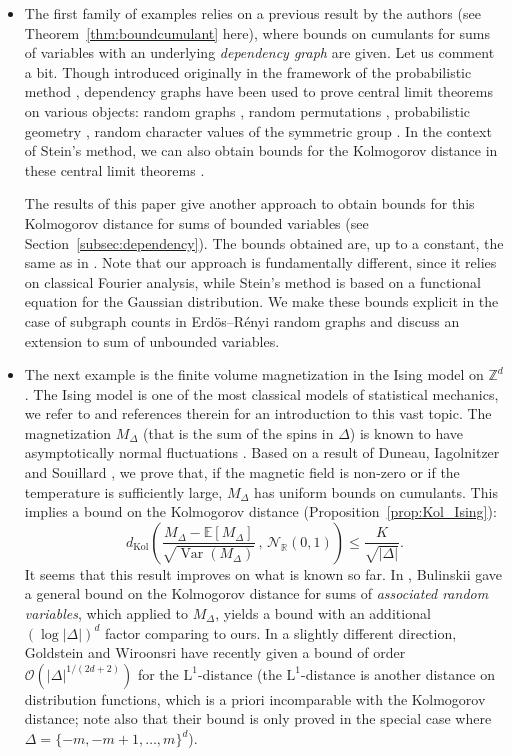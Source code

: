 \documentclass[envcountsame]{svmult}
\def\O{\mathcal{O}}
\newcommand{\Z}{\mathbb{Z}}
\newcommand{\R}{\mathbb{R}}
\newcommand{\esper}{\mathbb{E}}
\newcommand{\leb}{\mathrm{L}}
\newcommand{\dkol}{d_\mathrm{Kol}}
\newcommand{\gauss}{\mathcal{N}_{\R}(0,1)}
\DeclareMathOperator{\Var}{Var}
\begin{document}
\begin{itemize}
\item The first family of examples relies on a previous result by the authors \cite[Chapter 9]{FMN16} 
    (see Theorem~\ref{thm:boundcumulant} here), where bounds on cumulants for 
    sums of variables with an underlying {\em dependency graph} are given. Let us comment a bit. Though introduced originally in the framework of the probabilistic method \cite[Chapter 5]{AS08},
    dependency graphs have been used to prove central limit theorems on various objects:
    random graphs \cite{Jan88}, random permutations \cite{Bon10}, probabilistic geometry \cite{PY05},
    random character values of the symmetric group \cite[Chapter 11]{FMN16}.
    In the context of Stein's method,
    we can also obtain bounds for the Kolmogorov distance in these central limit theorems
    \cite{BR89,Rin94}.\vspace{2mm}

    \noindent The results of this paper give another approach to obtain bounds for this Kolmogorov distance
    for sums of bounded variables (see Section~\ref{subsec:dependency}).
    The bounds obtained are, up to a constant, the same as in \cite[Theorem 2.2]{Rin94}.
    Note that our approach is fundamentally different, since it relies on classical Fourier analysis,
    while Stein's method is based on a functional equation for the Gaussian distribution.
    We make these bounds explicit in the case of subgraph counts in Erd\"{o}s--Rényi random graphs
    and discuss an extension to sum of unbounded variables.
    
\item The next example is the finite volume magnetization in the Ising model on $\Z^d$.
    The Ising model is one of the most classical models of statistical mechanics, 
    we refer to
    \cite{Velenik} and references therein for an introduction to this vast topic.
    The magnetization $M_\Delta$ (that is the sum of the spins in $\Delta$) is known to have
    asymptotically normal fluctuations \cite{New80}.
    Based on a result of Duneau, Iagolnitzer and Souillard \cite{Duneau2},
    we prove that, if the magnetic field is non-zero or if the temperature is sufficiently large,
    $M_\Delta$ has uniform bounds on cumulants.
    This implies a bound on the Kolmogorov distance (Proposition~\ref{prop:Kol_Ising}):
  \[\dkol\left( \frac{M_\Delta-\esper[M_\Delta]}{\sqrt{\Var(M_\Delta)}}\,,\, \gauss\right) \le \frac{K}{\sqrt{|\Delta|}}.\]
  It seems that this result improves on what is known so far.
  In \cite{Bul96},  Bulinskii gave a general bound on the Kolmogorov distance
  for sums of {\em associated random variables}, which applied to $M_\Delta$,
  yields a bound with an additional $(\log |\Delta|)^d$ factor comparing to ours.
  In a slightly different direction, Goldstein and Wiroonsri \cite{GW16} have recently given a bound 
  of order $\O(|\Delta|^{1/(2d+2)})$ for
  the $\leb^1$-distance (the $\leb^1$-distance is another distance on distribution functions,
  which is a priori incomparable with the Kolmogorov distance;
  note also that their bound is only proved 
  in the special case where $\Delta=\{-m,-m+1,\ldots,m\}^d$).


\end{itemize}
\end{document}
